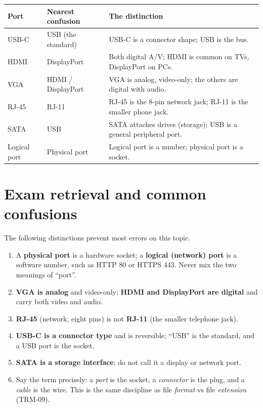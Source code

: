 \documentclass[11pt]{article}
\begin{document}
\begin{center}
\begin{tabular}{p{}p{}p{}}
\toprule
\textbf{Port} & \textbf{Nearest confusion} & \textbf{The distinction} \\
\midrule
USB-C & USB (the standard) & USB-C is a connector shape; USB is the bus. \\
HDMI & DisplayPort & Both digital A/V; HDMI is common on TVs, DisplayPort on PCs. \\
VGA & HDMI / DisplayPort & VGA is analog, video-only; the others are digital with audio. \\
RJ-45 & RJ-11 & RJ-45 is the 8-pin network jack; RJ-11 is the smaller phone jack. \\
SATA & USB & SATA attaches drives (storage); USB is a general peripheral port. \\
Logical port & Physical port & Logical port is a number; physical port is a socket. \\
\bottomrule
\end{tabular}
\end{center}

\section{Exam retrieval and common confusions}
The following distinctions prevent most errors on this topic.
\begin{enumerate}
  \item A \textbf{physical port} is a hardware socket; a \textbf{logical
    (network) port} is a software number, such as HTTP 80 or HTTPS 443. Never
    mix the two meanings of ``port''.
  \item \textbf{VGA is analog} and video-only; \textbf{HDMI and DisplayPort
    are digital} and carry both video and audio.
  \item \textbf{RJ-45} (network, eight pins) is not \textbf{RJ-11} (the
    smaller telephone jack).
  \item \textbf{USB-C is a connector type} and is reversible; ``USB'' is the
    standard, and a USB port is the socket.
  \item \textbf{SATA is a storage interface}; do not call it a display or
    network port.
  \item Say the term precisely: a \emph{port} is the socket, a
    \emph{connector} is the plug, and a \emph{cable} is the wire. This is the
    same discipline as file \emph{format} vs file \emph{extension} (TRM-09).
\end{enumerate}
\end{document}
